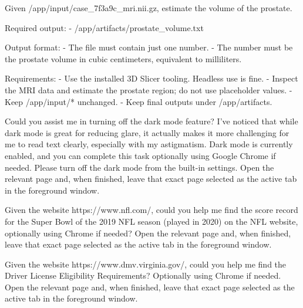 \begin{instructionbox}
Given \textasciigrave{}/app/input/case\_7f3a9c\_mri.nii.gz\textasciigrave{}, estimate the volume of the prostate.

Required output:
- \textasciigrave{}/app/artifacts/prostate\_volume.txt\textasciigrave{}

Output format:
- The file must contain just one number.
- The number must be the prostate volume in cubic centimeters, equivalent to milliliters.

Requirements:
- Use the installed 3D Slicer tooling. Headless use is fine.
- Inspect the MRI data and estimate the prostate region; do not use placeholder values.
- Keep \textasciigrave{}/app/input/*\textasciigrave{} unchanged.
- Keep final outputs under \textasciigrave{}/app/artifacts\textasciigrave{}.
\end{instructionbox}

\begin{instructionbox}
Could you assist me in turning off the dark mode feature? I've noticed that while dark mode is great for reducing glare, it actually makes it more challenging for me to read text clearly, especially with my astigmatism. Dark mode is currently enabled, and you can complete this task optionally using Google Chrome if needed. Please turn off the dark mode from the built-in settings. Open the relevant page and, when finished, leave that exact page selected as the active tab in the foreground window.
\end{instructionbox}

\begin{instructionbox}
Given the website \textasciigrave{}https://www.nfl.com/\textasciigrave{}, could you help me find the score record for the Super Bowl of the 2019 NFL season (played in 2020) on the NFL website, optionally using Chrome if needed? Open the relevant page and, when finished, leave that exact page selected as the active tab in the foreground window.
\end{instructionbox}

\begin{instructionbox}
Given the website \textasciigrave{}https://www.dmv.virginia.gov/\textasciigrave{}, could you help me find the Driver License Eligibility Requirements? Optionally using Chrome if needed. Open the relevant page and, when finished, leave that exact page selected as the active tab in the foreground window.
\end{instructionbox}

